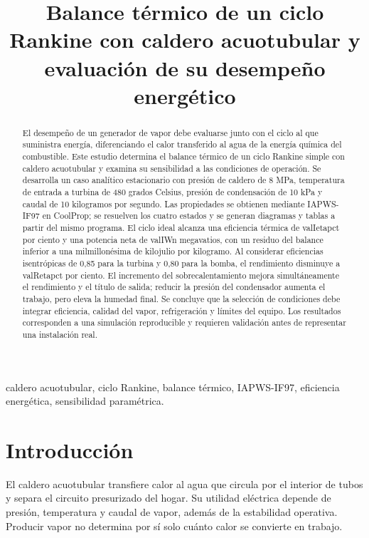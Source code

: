 \documentclass[conference,a4paper,11pt]{IEEEtran}
\newcommand{\V}[1]{\csname val#1\endcsname}
\begin{document}
\title{Balance térmico de un ciclo Rankine con caldero acuotubular y evaluación de su desempeño energético}
\author{
}
\maketitle

\begin{abstract}
El desempeño de un generador de vapor debe evaluarse junto con el ciclo al que suministra energía, diferenciando el calor transferido al agua de la energía química del combustible. Este estudio determina el balance térmico de un ciclo Rankine simple con caldero acuotubular y examina su sensibilidad a las condiciones de operación. Se desarrolla un caso analítico estacionario con presión de caldero de 8 MPa, temperatura de entrada a turbina de 480 grados Celsius, presión de condensación de 10 kPa y caudal de 10 kilogramos por segundo. Las propiedades se obtienen mediante IAPWS-IF97 en CoolProp; se resuelven los cuatro estados y se generan diagramas y tablas a partir del mismo programa. El ciclo ideal alcanza una eficiencia térmica de \V{Ietapct} por ciento y una potencia neta de \V{IWn} megavatios, con un residuo del balance inferior a una milmillonésima de kilojulio por kilogramo. Al considerar eficiencias isentrópicas de 0,85 para la turbina y 0,80 para la bomba, el rendimiento disminuye a \V{Retapct} por ciento. El incremento del sobrecalentamiento mejora simultáneamente el rendimiento y el título de salida; reducir la presión del condensador aumenta el trabajo, pero eleva la humedad final. Se concluye que la selección de condiciones debe integrar eficiencia, calidad del vapor, refrigeración y límites del equipo. Los resultados corresponden a una simulación reproducible y requieren validación antes de representar una instalación real.
\end{abstract}
\begin{IEEEkeywords}
caldero acuotubular, ciclo Rankine, balance térmico, IAPWS-IF97, eficiencia energética, sensibilidad paramétrica.
\end{IEEEkeywords}

\section{Introducción}
El caldero acuotubular transfiere calor al agua que circula por el interior de tubos y separa el circuito presurizado del hogar. Su utilidad eléctrica depende de presión, temperatura y caudal de vapor, además de la estabilidad operativa. Producir vapor no determina por sí solo cuánto calor se convierte en trabajo.
\end{document}
